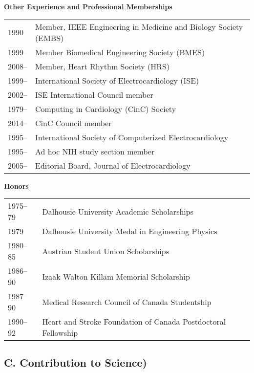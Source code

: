 \documentclass[10pt]{article}
\begin{document}
\noindent
\textbf{Other Experience and Professional Memberships}\\
\begin{tabular}[h]{lp{6.1in}}
1990-- & Member, IEEE Engineering in Medicine and Biology Society (EMBS) \\
1999-- & Member Biomedical Engineering Society (BMES)  \\
2008-- & Member, Heart Rhythm Society (HRS) \\
1999-- & International Society of Electrocardiology (ISE) \\
2002-- & ISE International Council member\\
1979-- & Computing in Cardiology (CinC) Society \\
2014-- & CinC Council member \\
1995-- & International Society of Computerized Electrocardiology\\
1995-- & Ad hoc NIH study section member \\
2005-- & Editorial Board, Journal of Electrocardiology\\
\end{tabular}

\noindent
\textbf{Honors}\\
\begin{tabular}[h]{ll}
    1975--79 & Dalhousie University Academic Scholarships\\
    1979     & Dalhousie University Medal in Engineering Physics \\
    1980--85 & Austrian Student Union Scholarships \\
    1986--90 & Izaak Walton Killam Memorial Scholarship \\
    1987--90 & Medical Research Council of Canada Studentship \\
    1990--92 & Heart and Stroke Foundation of Canada Postdoctoral Fellowship\\
\end{tabular}

\subsection*{C. Contribution to Science)}
\end{document}
